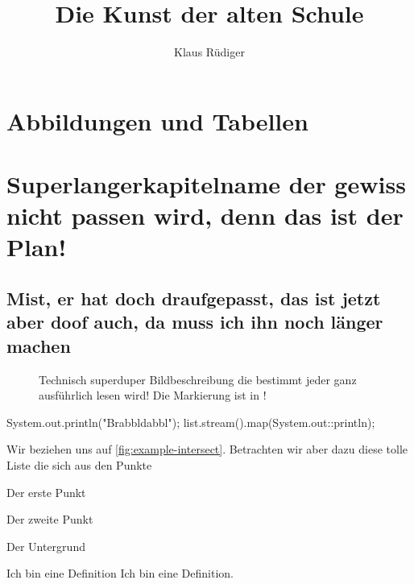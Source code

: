 \documentclass[userip]{lecture-digital}
\title{Die Kunst der alten Schule}
\subtitle{Klaus Rüdiger}
\begin{document}
\frontmatter
\maketitle

\RipPage{}%

\tableofcontents
\chapter{Abbildungen und Tabellen}
\listoffigures
\listoftables

\mainmatter

\chapter{Superlangerkapitelname der gewiss nicht passen wird, denn das ist der Plan!}

\section{Mist, er hat doch draufgepasst, das ist jetzt aber doof auch, da muss ich ihn noch länger machen}

\Blindtext[1]
\begin{figure}
    \centering{}
    \caption{Technisch superduper Bildbeschreibung die bestimmt jeder ganz ausführlich lesen wird! Die Markierung ist in \tikzAname!}
    \label{fig:example-intersect}
\end{figure}
\Blindtext[2]
\begin{java*}
System.out.println("Brabbldabbl");
list.stream().map(System.out::println);
\end{java*}
Wir beziehen uns auf \autoref{fig:example-intersect}. Betrachten wir aber dazu diese tolle Liste die sich aus den Punkte \begin{inlist}
    \item Der erste Punkt
    \item Der zweite Punkt
    \item Der Untergrund
\end{inlist}
\Blindtext[2]
\begin{definition}{Ich bin eine Definition}
    Ich bin eine Definition.
\end{definition}
\end{document}
